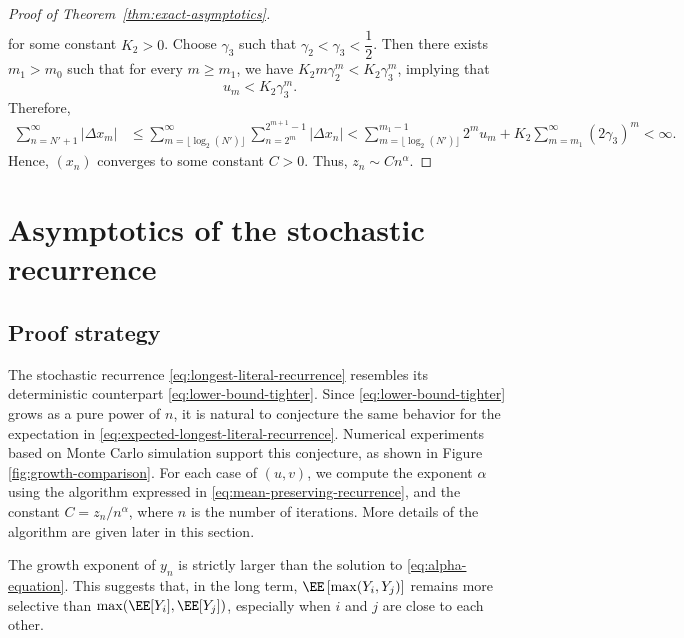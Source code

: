 \begin{proof}[Proof of Theorem~\ref{thm:exact-asymptotics}]
\begin{align*}
          \end{align*}
          for some constant $K_2>0$. Choose $\gamma_3$ such that $\gamma_2 < \gamma_3 < \dfrac{1}{2}$. Then there exists $m_1>m_0$ such that for every $m\ge m_1$, we have $K_2m\gamma_2^m < K_2\gamma_3^m$, implying that
          $$u_m < K_2\gamma_3^m.$$
          Therefore,
          \begin{align*}
            \sum_{n=N'+1}^\infty|\Delta x_{m}|
             & \le \sum_{m=\lfloor\log_2(N')\rfloor}^\infty \sum_{n=2^m}^{2^{m+1}-1}|\Delta x_n| < \sum_{m=\lfloor\log_2(N')\rfloor}^{m_1-1} 2^m u_m  + K_2\sum_{m=m_1}^\infty (2\gamma_3)^{m} < \infty.
          \end{align*}
          Hence, $(x_n)$ converges to some constant $C>0$. Thus, $z_n \sim Cn^\alpha$.
        \end{proof}

        \section{Asymptotics of the stochastic recurrence}

        \subsection{Proof strategy}

        The stochastic recurrence \eqref{eq:longest-literal-recurrence} resembles its deterministic counterpart \eqref{eq:lower-bound-tighter}. Since \eqref{eq:lower-bound-tighter} grows as a pure power of $n$, it is natural to conjecture the same behavior for the expectation in \eqref{eq:expected-longest-literal-recurrence}. Numerical experiments based on Monte Carlo simulation support this conjecture, as shown in Figure \ref{fig:growth-comparison}. For each case of $(u,v)$, we compute the exponent $\alpha$ using the algorithm expressed in \eqref{eq:mean-preserving-recurrence}, and the constant $C=z_n/n^\alpha$, where $n$ is the number of iterations. More details of the algorithm are given later in this section.

        The growth exponent of $y_n$ is strictly larger than the solution to \eqref{eq:alpha-equation}. This suggests that, in the long term, $\EE\left[\max(Y_i, Y_j)\right]$ remains more selective than $\max(\EE[Y_i], \EE[Y_j])$, especially when $i$ and $j$ are close to each other.

